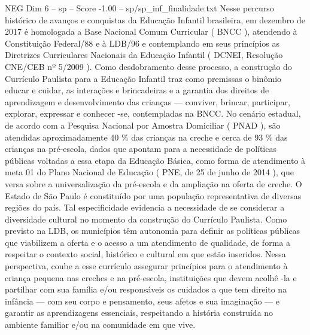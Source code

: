 \begin{textsample}{NEG Dim 6 – sp – Score -1.00 – sp/sp\_inf\_finalidade.txt}
Nesse percurso histórico de avanços e conquistas da Educação Infantil brasileira, em dezembro de 2017 é homologada a Base Nacional Comum Curricular ( BNCC ), atendendo à Constituição Federal/88 e à LDB/96 e contemplando em seus princípios as Diretrizes Curriculares Nacionais da Educação Infantil ( DCNEI, Resolução CNE/CEB nº 5/2009 ).
Como desdobramento desse processo, a construção do Currículo Paulista para a Educação Infantil traz como premissas o binômio educar e cuidar, as interações e brincadeiras e a garantia dos direitos de aprendizagem e desenvolvimento das crianças — conviver, brincar, participar, explorar, expressar e conhecer -se, contempladas na BNCC.
No cenário estadual, de acordo com a Pesquisa Nacional por Amostra Domiciliar ( PNAD ), são atendidas aproximadamente 40 \% das crianças na creche e cerca de 93 \% das crianças na pré-escola, dados que apontam para a necessidade de políticas públicas voltadas a essa etapa da Educação Básica, como forma de atendimento à meta 01 do Plano Nacional de Educação ( PNE, de 25 de junho de 2014 ), que versa sobre a universalização da pré-escola e da ampliação na oferta de creche.
O Estado de São Paulo é constituído por uma população representativa de diversas regiões do país.
Tal especificidade evidencia a necessidade de se considerar a diversidade cultural no momento da construção do Currículo Paulista.
Como previsto na LDB, os municípios têm autonomia para definir as políticas públicas que viabilizem a oferta e o acesso a um atendimento de qualidade, de forma a respeitar o contexto social, histórico e cultural em que estão inseridos.
Nessa perspectiva, coube a esse currículo assegurar princípios para o atendimento à criança pequena nas creches e na pré-escola, instituições que devem acolhê -la e partilhar com sua família e/ou responsáveis os cuidados a que tem direito na infância — com seu corpo e pensamento, seus afetos e sua imaginação — e garantir as aprendizagens essenciais, respeitando a história construída no ambiente familiar e/ou na comunidade em que vive.

\end{textsample}
